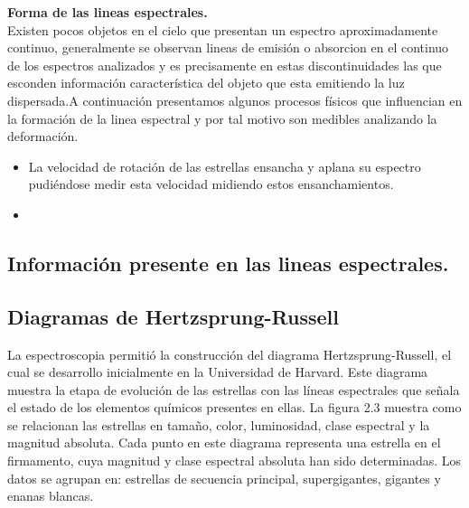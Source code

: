 \noindent \textbf{Forma de las lineas espectrales.}\\
Existen pocos objetos en el cielo que presentan un espectro aproximadamente continuo, generalmente se observan lineas de emisión o absorcion en el continuo de los espectros analizados y es precisamente en estas discontinuidades las que esconden información característica del objeto que esta emitiendo la luz dispersada.A continuación presentamos algunos procesos físicos que influencian en la formación de la linea espectral y por tal motivo son medibles analizando la deformación.

\begin{itemize}
    \item La velocidad de rotación de las estrellas ensancha y aplana su espectro pudiéndose medir esta velocidad midiendo estos ensanchamientos.
    \item 
\end{itemize}{}





\subsection {Información presente en las lineas espectrales.}










\subsection {Diagramas de Hertzsprung-Russell}


\noindent La espectroscopia permitió la construcción del diagrama Hertzsprung-Russell, el cual se desarrollo inicialmente en la Universidad de Harvard.
Este diagrama muestra la etapa de evolución de las estrellas con las líneas espectrales que señala el estado de los elementos químicos presentes en ellas. La figura 2.3 muestra como se relacionan las estrellas en tamaño, color, luminosidad, clase espectral y la magnitud absoluta. Cada punto en este diagrama representa una estrella en el firmamento, cuya magnitud y clase espectral absoluta han sido determinadas. Los datos se agrupan en: estrellas de secuencia principal, supergigantes, gigantes y enanas
blancas.




